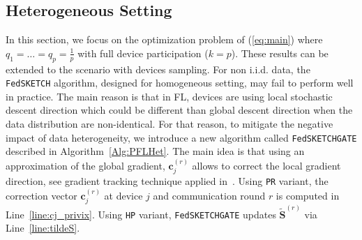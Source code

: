 \documentclass[sigconf, anonymous, review]{acmart}
\begin{document}
\subsection{Heterogeneous Setting}

In this section, we focus on the optimization problem of (\ref{eq:main}) where $q_1=\ldots=q_p=\frac{1}{p}$ with full device participation ($k=p$). 
These results can be extended to the scenario with devices sampling.
For non i.i.d. data, the \texttt{FedSKETCH} algorithm, designed for homogeneous setting, may fail to perform well in practice. 
The main reason is that in FL, devices are using local stochastic descent direction which could be different than global descent direction when the data distribution are non-identical. 
For that reason, to mitigate the negative impact of data heterogeneity, we introduce a new algorithm called \texttt{FedSKETCHGATE} described in Algorithm~\ref{Alg:PFLHet}. 
The main idea is that using an approximation of the global gradient, $\mathbf{c}_j^{(r)}$ allows to correct the local gradient direction, see  gradient tracking technique applied in~\citep{liang2019variance,haddadpour2020federated}. 
Using \texttt{PR} variant, the correction vector $\mathbf{c}_j^{(r)}$ at device $j$ and communication round $r$ is computed in Line~\ref{line:cj_privix}. 
Using \texttt{HP} variant, \texttt{FedSKETCHGATE} updates $\tilde{\mathbf{S}}^{(r)}$ via Line~\ref{line:tildeS}.
\end{document}
